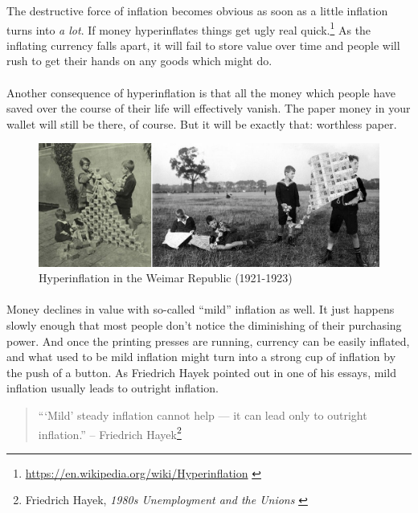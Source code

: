 The destructive force of inflation becomes obvious as soon as a little inflation
turns into \textit{a lot}. If money hyperinflates things get ugly real
quick.\footnote{\url{https://en.wikipedia.org/wiki/Hyperinflation}
\cite{wiki:hyperinflation}} As the inflating currency falls apart, it will fail
to store value over time and people will rush to get their hands on any goods
which might do.

\paragraph{}
Another consequence of hyperinflation is that all the money which people
have saved over the course of their life will effectively vanish. The
paper money in your wallet will still be there, of course. But it will
be exactly that: worthless paper.

\begin{figure}
  \includegraphics{assets/images/children-playing-with-money.png}
  \caption{Hyperinflation in the Weimar Republic (1921-1923)}
  \label{fig:children-playing-with-money}
\end{figure}

\paragraph{}
Money declines in value with so-called \enquote{mild} inflation as well. It
just happens slowly enough that most people don't notice the diminishing
of their purchasing power. And once the printing presses are running,
currency can be easily inflated, and what used to be mild inflation
might turn into a strong cup of inflation by the push of a button. As
Friedrich Hayek pointed out in one of his essays, mild inflation usually
leads to outright inflation.

\begin{quotation}\begin{samepage}
\enquote{`Mild' steady inflation cannot help --- it can lead only to outright
inflation.}
\flushright -- Friedrich Hayek\footnote{Friedrich Hayek, \textit{1980s
Unemployment and the Unions} \cite{hayek-inflation}}
\end{samepage}\end{quotation}

